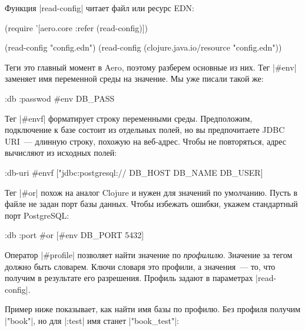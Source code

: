 Функция \spverb|read-config| читает файл или ресурс EDN:

\begin{english}
  \begin{clojure}
(require '[aero.core :refer (read-config)])

(read-config "config.edn")
(read-config (clojure.java.io/resource "config.edn"))
  \end{clojure}
\end{english}

Теги это главный момент в Aero, поэтому разберем основные из них. Тег
\spverb|#env| заменяет имя переменной среды на значение. Мы уже писали такой
же:

\begin{english}
  \begin{clojure}
{:db {:passwod #env DB_PASS}}
  \end{clojure}
\end{english}

Тег \spverb|#envf| форматирует строку переменными среды. Предположим,
подключение к базе состоит из отдельных полей, но вы предпочитаете JDBC URI~---
длинную строку, похожую на веб-адрес. Чтобы не повторяться, адрес вычисляют из
исходных полей:

\begin{english}
  \begin{clojure}
{:db-uri #envf ["jdbc:postgresql://%
                DB_HOST DB_NAME DB_USER]}
  \end{clojure}
\end{english}

Тег \spverb|#or| похож на аналог Clojure и нужен для значений по
умолчанию. Пусть в файле не задан порт базы данных. Чтобы избежать ошибки,
укажем стандартный порт PostgreSQL:

\begin{english}
  \begin{clojure}
{:db {:port #or [#env DB_PORT 5432]}}
  \end{clojure}
\end{english}

Оператор \spverb|#profile| позволяет найти значение по
\emph{профилилю}. Значение за тегом должно быть словарем. Ключи словаря это
профили, а значения~--- то, что получим в результате его разрешения. Профиль
задают в параметрах \spverb|read-config|.

Пример ниже показывает, как найти имя базы по профилю. Без профиля получим
\spverb|"book"|, но для \spverb|:test| имя станет \spverb|"book_test"|:

